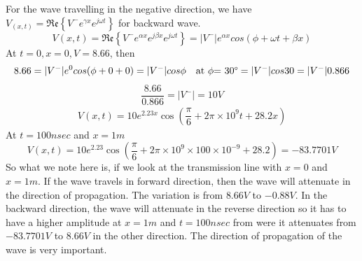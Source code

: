 \begin{exmp}
For the wave travelling in the negative direction, we have $V_{(x,t)} = \mathfrak{Re}\left\lbrace V^{-}e^{\gamma x}e^{j\omega t}\right\rbrace$ for backward wave.
\begin{dmath*}
V(x,t) = \mathfrak{Re}\left\lbrace{V^{-}e^{\alpha x}e^{j\beta x}e^{j\omega t}}\right\rbrace = |V^{-}|e^{\alpha x}cos{(\phi+\omega t + \beta x)}
\end{dmath*}
At ${t=0, x=0, V=8.66}$, then
\begin{dmath*}
{8.66} = {|V^{-}|}e^{0} cos({\phi + 0 + 0})
= {|V^-|{cos\phi}} \quad \text{at }\phi\text{= 30\textdegree} 
= {|V^-|{cos30}}
= {|V^-|{0.866}}
\end{dmath*}
\begin{dmath*}
\frac{8.66}{0.866} = {|V^-|} = 10V
\end{dmath*}
\begin{align*}
V({x,t}) = 10e^{2.23x} \cos({\dfrac{\pi}{6} + 2\pi\times10^9t + 28.2x})
\end{align*}
At ${t=100nsec}$ and ${x=1m}$
\begin{dmath*}
V({x,t}) = 10e^{2.23} \cos({\dfrac{\pi}{6} + 2\pi\times10^9\times100\times10^{-9} + 28.2})
= -83.7701V
\end{dmath*}
So what we note here is, if we look at the transmission line with ${x=0}$ and ${x=1m}$. If the wave travels in forward direction, then the wave will attenuate in the direction of propagation. The variation is from ${8.66V}$ to ${-0.88V}$. In the backward direction, the wave will attenuate in the reverse direction so it has to  have a higher amplitude at ${x=1m}$ and ${t=100nsec}$ from were it attenuates from ${-83.7701V}$ to ${8.66V}$ in the other direction. The direction of propagation of the wave is very important.
\end{exmp}
    


